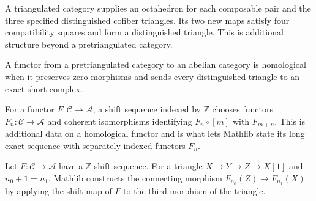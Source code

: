 \begin{definition}
  \label{def:mathlib-octahedron}
  \mathlibok
  A triangulated category supplies an octahedron for each composable pair
  and the three specified distinguished cofiber triangles. Its two new
  maps satisfy four compatibility squares and form a distinguished triangle.
  This is additional structure beyond a pretriangulated category.
\end{definition}

\begin{definition}
  \label{def:mathlib-homological-functor}
  \mathlibok
  A functor from a pretriangulated category to an abelian category is
  homological when it preserves zero morphisms and sends every distinguished
  triangle to an exact short complex.
\end{definition}

\begin{definition}
  \label{def:mathlib-homological-shift-sequence}
  \mathlibok
  For a functor $F:\mathcal C\to\mathcal A$, a shift sequence indexed by
  $\mathbb Z$ chooses functors $F_n:\mathcal C\to\mathcal A$ and coherent
  isomorphisms identifying $F_n\circ[m]$ with $F_{m+n}$.  This is additional
  data on a homological functor and is what lets Mathlib state its long exact
  sequence with separately indexed functors $F_n$.
\end{definition}

\begin{definition}
  \label{def:mathlib-homology-sequence-connecting}
  \mathlibok
  Let $F:\mathcal C\to\mathcal A$ have a $\mathbb Z$-shift sequence.  For a
  triangle $X\to Y\to Z\to X[1]$ and $n_0+1=n_1$, Mathlib constructs the
  connecting morphism $F_{n_0}(Z)\to F_{n_1}(X)$ by applying the shift map of
  $F$ to the third morphism of the triangle.
\end{definition}

